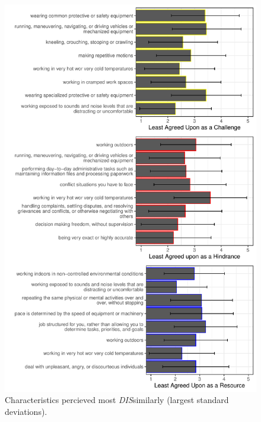 \documentclass[
  english,
  man]{apa6}
\begin{document}
\begin{figure}
\centering
\includegraphics{Submission_files/figure-latex/combinegraphs2-1.pdf}
\caption{\label{fig:combinegraphs2}Characteristics percieved most \emph{DIS}similarly (largest standard deviations).}
\end{figure}
\end{document}
